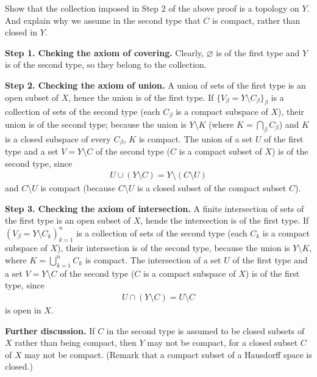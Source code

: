 \begin{prob}\label{check 1p cptf topology}
    Show that the collection imposed in Step 2 of the above proof is a topology on $Y$.
    And explain why we assume in the second type that $C$ is compact, rather than closed in $Y$.
\end{prob}
\begin{sol}
    \textbf{Step 1. Cheking the axiom of covering.}\newline\noindent
    Clearly, $\varnothing$ is of the first type and $Y$ is of the second type, so they belong to the collection.

    \textbf{Step 2. Checking the axiom of union.}\newline\noindent
    A union of sets of the first type is an open subset of $X$, hence the union is of the first type.
    If $\{V_\beta=Y\setminus C_\beta\}_\beta$ is a collection of sets of the second type (each $C_\beta$ is a compact subspace of $X$), their union is of the second type; because the union is $Y\setminus K$ (where $K=\bigcap_\beta C_\beta$) and $K$ is a closed subspace of every $C_\beta$, $K$ is compact.
    The union of a set $U$ of the first type and a set $V=Y\setminus C$ of the second type ($C$ is a compact subset of $X$) is of the second type, since
    \begin{align*}
        U\cup (Y\setminus C)=Y\setminus (C\setminus U)
    \end{align*}
    and $C\setminus U$ is compact (because $C\setminus U$ is a closed subset of the compact subset $C$).

    \textbf{Step 3. Checking the axiom of intersection.}\newline\noindent
    A finite intersection of sets of the first type is an open subset of $X$, hende the intersection is of the first type.
    If $(V_\beta=Y\setminus C_k)_{k=1}^n$ is a collection of sets of the second type (each $C_k$ is a compact subspace of $X$), their intersection is of the second type, because the union is $Y\setminus K$, where $K=\bigcup_{k=1}^n C_k$ is compact.
    The intersection of a set $U$ of the first type and a set $V=Y\setminus C$ of the second type ($C$ is a compact subspace of $X$) is of the first type, since
    \begin{align*}
        U\cap (Y\setminus C)=U\setminus C
    \end{align*}
    is open in $X$.

    \textbf{Further discussion.}
    If $C$ in the second type is assumed to be closed subsets of $X$ rather than being compact, then $Y$ may not be compact, for a closed subset $C$ of $X$ may not be compact.
    (Remark that a compact subset of a Hausdorff space is closed.)
\end{sol}


